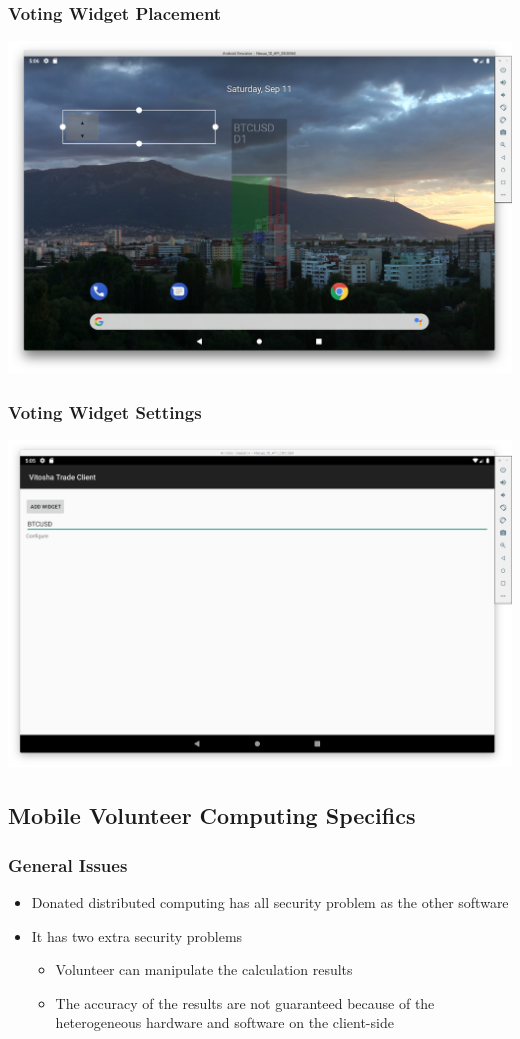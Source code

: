 \documentclass{beamer}
\begin{document}
\begin{frame}
\frametitle{Voting Widget Placement}
\includegraphics[scale=0.15]{fig07}
\end{frame}

\begin{frame}
\frametitle{Voting Widget Settings}
\includegraphics[scale=0.15]{fig08}
\end{frame}

\subsection{Mobile Volunteer Computing Specifics}

\begin{frame}
\frametitle{General Issues}
\begin{itemize}
	\item Donated distributed computing has all security problem as the other software
	\item It has two extra security problems
	\begin{itemize}
		\item Volunteer can manipulate the calculation results
		\item The accuracy of the results are not guaranteed because of the heterogeneous hardware and software on the client-side
	\end{itemize}
\end{itemize}
\end{frame}
\end{document}

